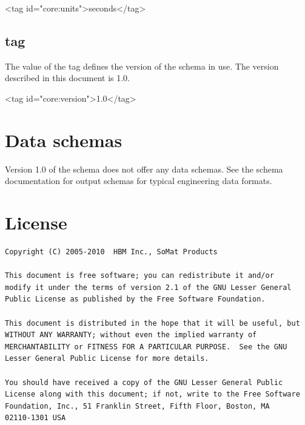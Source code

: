 \documentclass{article}
\newcommand{\corever}{1.0}
\begin{document}
\begin{siexmlexample}
<tag id="core:units">seconds</tag>
\end{siexmlexample}

\subsection{ tag}

The value of the  tag defines the version of the
 schema in use.  The version described in this document is
\corever{}.

\begin{siexmlexample}
<tag id="core:version">1.0</tag>
\end{siexmlexample}

\section{Data schemas}

Version \corever{} of the  schema does not offer any data
schemas.  See the  schema documentation for output schemas
for typical engineering data formats.

\appendix

\section{License}

\begin{verbatim}
Copyright (C) 2005-2010  HBM Inc., SoMat Products

This document is free software; you can redistribute it and/or
modify it under the terms of version 2.1 of the GNU Lesser General
Public License as published by the Free Software Foundation.

This document is distributed in the hope that it will be useful, but
WITHOUT ANY WARRANTY; without even the implied warranty of
MERCHANTABILITY or FITNESS FOR A PARTICULAR PURPOSE.  See the GNU
Lesser General Public License for more details.

You should have received a copy of the GNU Lesser General Public
License along with this document; if not, write to the Free Software
Foundation, Inc., 51 Franklin Street, Fifth Floor, Boston, MA
02110-1301 USA
\end{verbatim}
\end{document}
